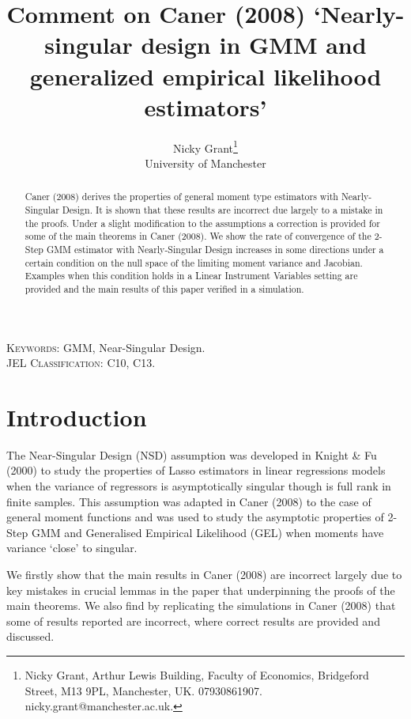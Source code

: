 \documentclass[11pt, fleqn]{article}
\begin{document}
\title{Comment on Caner (2008) `Nearly-singular design in GMM and generalized empirical likelihood estimators'}

\author{Nicky Grant\let\thefootnote\relax\footnote{
Nicky Grant, Arthur Lewis Building, Faculty of Economics, Bridgeford Street, M13 9PL, Manchester, UK. 07930861907. nicky.grant@manchester.ac.uk.}  \\
 University of Manchester \\}
\maketitle

\begin{abstract}
 \small
 
  Caner (2008)   derives the properties of general moment type estimators with Nearly- Singular Design. It is shown that these results are incorrect due largely to a mistake in the proofs.
   Under a slight modification to the  assumptions   a correction is provided for some of the main theorems in  Caner (2008).
We show  the rate of convergence of the  2-Step GMM estimator with Nearly-Singular Design increases in some directions under a certain condition on the null space of the limiting moment variance and Jacobian. Examples when this condition holds in a Linear Instrument Variables setting are  provided and the main results of this paper  verified in a simulation.


\end{abstract}
\textsc{Keywords}: GMM, Near-Singular Design.\\
\textsc{JEL Classification:} C10, C13.




\section{Introduction}

The Near-Singular Design (NSD) assumption was developed in Knight \& Fu (2000) to study the properties of Lasso  estimators in linear regressions models when the variance of regressors is asymptotically singular though is full rank in finite samples. This assumption was adapted in Caner (2008) to the case of general moment functions and was used to study the asymptotic properties of  2-Step GMM and  Generalised Empirical Likelihood (GEL) when moments have variance `close' to singular.


We firstly show that the main results in Caner (2008) are incorrect largely due to  key mistakes in  crucial lemmas in the paper that underpinning  the  proofs of the main theorems.  We  also find by replicating the simulations in Caner (2008) that some of  results reported are incorrect, where correct results are provided and discussed.
\end{document}
